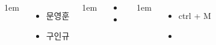 \documentclass[	20pt, 
							a1paper, 
							portrait, %
							margin=0mm, %
							innermargin=10mm,  		%
							colspace=5mm, 
							subcolspace=0mm
							]{tikzposter}
\begin{document}
\begin{columns}
			{
					\setlength{\leftmargini}{4em}
					\setlength{\labelsep} {1em}
					\begin{itemize}
					\item  문영훈 
					\item  구인규 
					\end{itemize}
			} %

			{
					\setlength{\leftmargini}{4em}
					\setlength{\labelsep} {1em}
					\begin{itemize}
					\item 
					\item 
					\end{itemize}
			} %


			{
					\setlength{\leftmargini}{4em}
					\setlength{\labelsep} {1em}
					\begin{itemize}
					\item  ctrl + M
					\item 
					\end{itemize}
			} %



	\end{columns}
\end{document}
